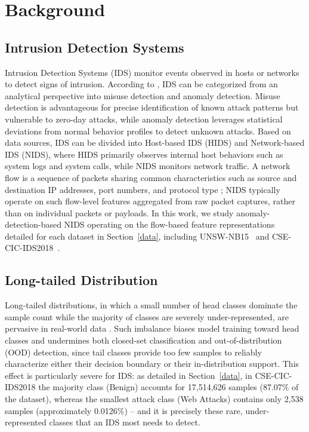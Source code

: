 \documentclass[sigconf]{acmart}
\begin{document}
\section{Background}
\subsection{Intrusion Detection Systems}
\label{IDS}
Intrusion Detection Systems (IDS) monitor events observed in hosts or networks to detect signs of intrusion. According to \cite{liu2019machine}, IDS can be categorized from an analytical perspective into misuse detection and anomaly detection. Misuse detection is advantageous for precise identification of known attack patterns but vulnerable to zero-day attacks, while anomaly detection leverages statistical deviations from normal behavior profiles to detect unknown attacks. Based on data sources, IDS can be divided into Host-based IDS (HIDS) and Network-based IDS (NIDS), where HIDS primarily observes internal host behaviors such as system logs and system calls, while NIDS monitors network traffic. A network flow is a sequence of packets sharing common characteristics such as source and destination IP addresses, port numbers, and protocol type \citep{moustafa2015unsw}; NIDS typically operate on such flow-level features aggregated from raw packet captures, rather than on individual packets or payloads. In this work, we study anomaly-detection-based NIDS operating on the flow-based feature representations detailed for each dataset in Section~\ref{data}, including UNSW-NB15~\citep{moustafa2015unsw} and CSE-CIC-IDS2018~\citep{sharafaldin2018toward}.

\subsection{Long-tailed Distribution}
Long-tailed distributions, in which a small number of head classes dominate the sample count while the majority of classes are severely under-represented, are pervasive in real-world data \citep{wang2020long}. Such imbalance biases model training toward head classes and undermines both closed-set classification and out-of-distribution (OOD) detection, since tail classes provide too few samples to reliably characterize either their decision boundary or their in-distribution support. This effect is particularly severe for IDS: as detailed in Section~\ref{data}, in CSE-CIC-IDS2018 the majority class (Benign) accounts for 17,514,626 samples (87.07\% of the dataset), whereas the smallest attack class (Web Attacks) contains only 2,538 samples (approximately 0.0126\%) -- and it is precisely these rare, under-represented classes that an IDS most needs to detect.
\end{document}
